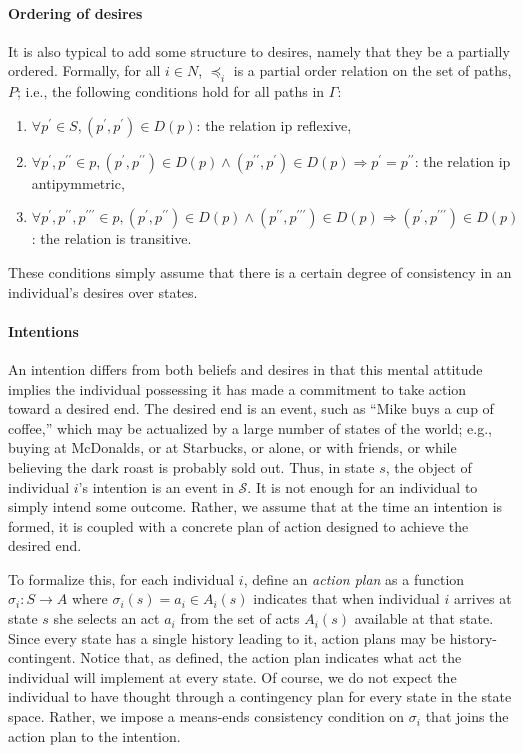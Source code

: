\documentclass[
11pt,
titlepage,
reqno,
]{article}%
\theoremstyle{definition}
\begin{document}
	\paragraph{Ordering of desires \label{para: desire ordering}} 
	It is also typical to add some structure to desires, namely that they be a partially ordered. 
	Formally, for all $i\in N$, $\preceq_i$ is a partial order relation on the set of paths, $P$; i.e., the following conditions hold for all paths in $\Gamma$:
	\begin{enumerate}
		\item $\forall  p^\prime\in S, (p^\prime,p^\prime)\in D(p)$: the relation ip reflexive,
		\item $\forall  p^\prime,p^{\prime\prime}\in p,(p^\prime,p^{\prime\prime})\in D(p)\wedge (p^{\prime\prime},p^\prime)\in D(p)\Rightarrow p^\prime=p^{\prime\prime}$: the relation ip antipymmetric,
		\item $\forall  p^\prime, p^{\prime\prime}, p^{\prime\prime\prime}\in p, (p^\prime,p^{\prime\prime})\in D(p)\wedge (p^{\prime\prime},p^{\prime\prime\prime})\in D(p)\Rightarrow  (p^{\prime},p^{\prime\prime\prime})\in D(p)$: the relation is transitive.
	\end{enumerate} 
	These conditions simply assume that there is a certain degree of consistency in an individual's desires over states. 
	
	\paragraph{Intentions\label{para: intentons}} 
	An intention differs from both beliefs and desires in that this mental attitude implies the individual possessing it has made a commitment to take action toward a desired end. 
	The desired end is an event, such as ``Mike buys a cup of coffee,'' which may be actualized by a large number of states of the world; e.g., buying at McDonalds, or at Starbucks, or alone, or with friends, or while believing the dark roast is probably sold out. Thus, in state $s$, the object of individual $i$'s intention is an event in $\mathcal{S}$. 
	It is not enough for an individual to simply intend some outcome. 
	Rather, we assume that at the time an intention is formed, it is coupled with a concrete plan of action designed to achieve the desired end. 
	
	To formalize this, for each individual $i$, define an \textit{action plan} as a function $\sigma_i:S\rightarrow A$ where $\sigma_i(s)=a_i\in A_i(s)$ indicates that when individual $i$ arrives at state $s$ she selects an act $a_i$ from the set of acts $A_i(s)$ available at that state. 
	Since every state has a single history leading to it, action plans may be history-contingent.
	Notice that, as defined, the action plan indicates what act the individual will implement at every state. 
	Of course, we do not expect the individual to have thought through a contingency plan for every state in the state space. 
	Rather, we impose a means-ends consistency condition on $\sigma_i$ that joins the action plan to the intention.
	
\end{document}
